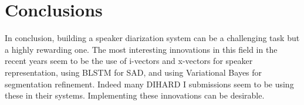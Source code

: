 \chapter{Conclusions}

In conclusion, building a speaker diarization system can be a challenging task but a highly rewarding one. The most interesting innovations in this field in the recent years seem to be the use of i-vectors and x-vectors for speaker representation, using BLSTM for SAD, and using Variational Bayes for segmentation refinement. Indeed many DIHARD I submissions seem to be using these in their systems. Implementing these innovations can be desirable.